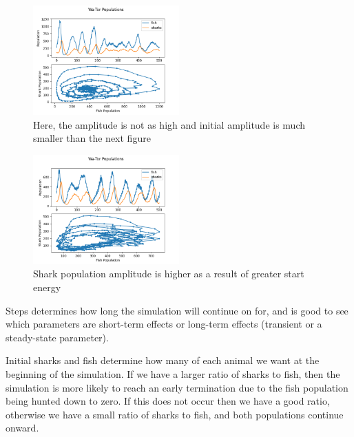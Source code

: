 \documentclass[12pt]{iopart} %
\begin{document}
\begin{figure}[h!tbp]
  \begin{center}
  \item[]\includegraphics[width=0.5\textwidth]{figure25.png}
  \caption{\label{fig:figure25}
  Here, the amplitude is not as high and initial amplitude is much smaller than the next figure
  }
  \end{center}
\end{figure}

\begin{figure}[h!tbp]
  \begin{center}
  \item[]\includegraphics[width=0.5\textwidth]{figure26.png}
  \caption{\label{fig:figure26}
  Shark population amplitude is higher as a result of greater start energy
  }
  \end{center}
\end{figure}

Steps determines how long the simulation will continue on for, and is good to see which parameters are short-term effects or long-term effects (transient or a steady-state parameter).

Initial sharks and fish determine how many of each animal we want at the beginning of the simulation. 
If we have a larger ratio of sharks to fish, then the simulation is more likely to reach an early termination due to the fish population being hunted down to zero. 
If this does not occur then we have a good ratio, otherwise we have a small ratio of sharks to fish, and both populations continue onward.
\end{document}
